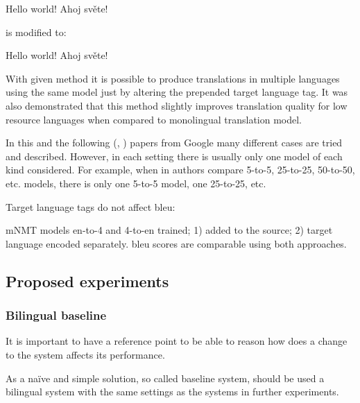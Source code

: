 \begin{displayquote}
Hello world! \to{} Ahoj světe!
\end{displayquote}
is modified to:

\begin{displayquote}
 Hello world! \to{} Ahoj světe!
\end{displayquote}

With given method it is possible to produce translations in multiple languages using the
same model just by altering the prepended target language tag.
It was also demonstrated that this method slightly improves translation quality for 
low resource languages when compared to monolingual translation model.

In this and the following
(, )
papers from Google many different cases are tried and described.
However, in each setting there is usually only one model of each kind considered.
For example, when in  authors compare 5-to-5,
25-to-25, 50-to-50, etc. models, there is only one 5-to-5 model, one 25-to-25, etc.

Target language tags do not affect \acrshort{bleu}:

mNMT models en-to-4 and 4-to-en trained;
 1)  added to the source;
 2) target language encoded separately.
\acrshort{bleu} scores are comparable using both approaches.


\subsection{Proposed experiments}
\label{subsection:proposed_experiments}


\subsubsection*{Bilingual baseline}

It is important to have a reference point to be able to reason how
does a change to the system affects its performance.

As a naïve and simple solution, so called \gls{baseline} system,
should be used a bilingual system with the same settings
as the systems in further experiments.

